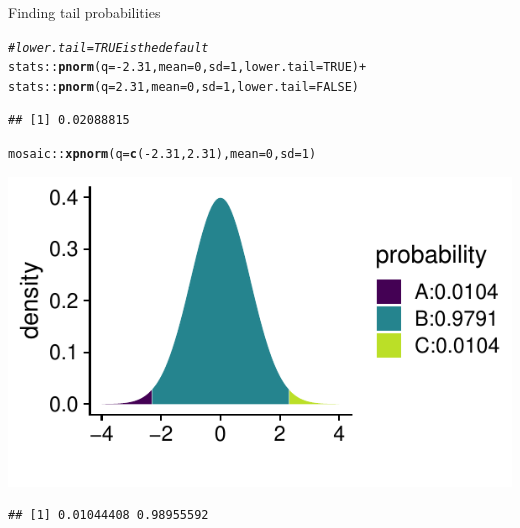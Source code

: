 \documentclass[10pt,handout]{beamer}\usepackage[]{graphicx}\usepackage[]{color}
\makeatletter
\newcommand{\hlnum}[1]{\textcolor[rgb]{0.686,0.059,0.569}{#1}}%
\newcommand{\hlcom}[1]{\textcolor[rgb]{0.678,0.584,0.686}{\textit{#1}}}%
\newcommand{\hlopt}[1]{\textcolor[rgb]{0,0,0}{#1}}%
\newcommand{\hlstd}[1]{\textcolor[rgb]{0.345,0.345,0.345}{#1}}%
\newcommand{\hlkwc}[1]{\textcolor[rgb]{0.333,0.667,0.333}{#1}}%
\newcommand{\hlkwd}[1]{\textcolor[rgb]{0.737,0.353,0.396}{\textbf{#1}}}%
\newenvironment{kframe}{%
 \def\at@end@of@kframe{}%
 \ifinner\ifhmode%
  \def\at@end@of@kframe{\end{minipage}}%
  \begin{minipage}{\columnwidth}%
 \fi\fi%
 \def\FrameCommand##1{\hskip\@totalleftmargin \hskip-\fboxsep
 \colorbox{shadecolor}{##1}\hskip-\fboxsep
     \hskip-\linewidth \hskip-\@totalleftmargin \hskip\columnwidth}%
 \MakeFramed {\advance\hsize-\width
   \@totalleftmargin\z@ \linewidth\hsize
   \@setminipage}}%
 {\par\unskip\endMakeFramed%
 \at@end@of@kframe}
\newenvironment{knitrout}{}{} %
\makeatother
\begin{document}
\begin{frame}[fragile]{Finding tail probabilities}
	
	
	
\begin{knitrout}\tiny
{}\color{fgcolor}\begin{kframe}
\begin{alltt}
\hlcom{# lower.tail = TRUE is the default}
\hlstd{stats}\hlopt{::}\hlkwd{pnorm}\hlstd{(}\hlkwc{q} \hlstd{=} \hlopt{-}\hlnum{2.31}\hlstd{,} \hlkwc{mean} \hlstd{=} \hlnum{0}\hlstd{,} \hlkwc{sd} \hlstd{=} \hlnum{1}\hlstd{,} \hlkwc{lower.tail} \hlstd{=} \hlnum{TRUE}\hlstd{)} \hlopt{+}
\hlstd{stats}\hlopt{::}\hlkwd{pnorm}\hlstd{(}\hlkwc{q} \hlstd{=} \hlnum{2.31}\hlstd{,} \hlkwc{mean} \hlstd{=} \hlnum{0}\hlstd{,} \hlkwc{sd} \hlstd{=} \hlnum{1}\hlstd{,} \hlkwc{lower.tail} \hlstd{=} \hlnum{FALSE}\hlstd{)}
\end{alltt}
\begin{verbatim}
## [1] 0.02088815
\end{verbatim}
\end{kframe}
\end{knitrout}
	
	\pause 
	
\begin{knitrout}\tiny
{}\color{fgcolor}\begin{kframe}
\begin{alltt}
\hlstd{mosaic}\hlopt{::}\hlkwd{xpnorm}\hlstd{(}\hlkwc{q} \hlstd{=} \hlkwd{c}\hlstd{(}\hlopt{-}\hlnum{2.31}\hlstd{,}\hlnum{2.31}\hlstd{),} \hlkwc{mean} \hlstd{=} \hlnum{0}\hlstd{,} \hlkwc{sd} \hlstd{=} \hlnum{1}\hlstd{)}
\end{alltt}
\end{kframe}

{\centering \includegraphics[width=0.6\linewidth]{figure/probs7-1} 

}


\begin{kframe}\begin{verbatim}
## [1] 0.01044408 0.98955592
\end{verbatim}
\end{kframe}
\end{knitrout}
	
	
\end{frame}
\end{document}
